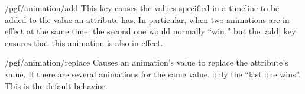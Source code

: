\begin{key}{/pgf/animation/add}
  This key causes the values specified in a timeline to be added to
  the value an attribute has. In particular, when two animations are
  in effect at the same time, the second one would normally ``win,''
  but the |add| key ensures that this animation is also in effect.
\begin{codeexample}[width=2cm]
\end{codeexample}  
\begin{codeexample}[width=2cm]
\end{codeexample}  
\end{key}

\begin{key}{/pgf/animation/replace}
  Causes an animation's value to replace the attribute's value. If
  there are several animations for the same value, only the ``last one
  wins''. This is the default behavior.
\end{key}


\endinput



